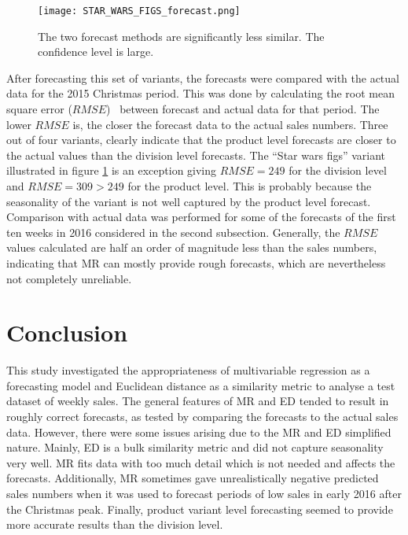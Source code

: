 \documentclass[11pt]{article}
\begin{document}
\begin{figure}[ht]
\centering
\texttt{[image: STAR\_WARS\_FIGS\_forecast.png]}
\caption{The two forecast methods are significantly less similar. The confidence level is large.}
\label{32}
\end{figure}

After forecasting this set of variants, the forecasts were compared with the actual data for the 2015 Christmas period. This was done by calculating the root mean square error ($RMSE$)~\cite{Hynd} between forecast and actual data for that period. The lower $RMSE$ is, the closer the forecast data to the actual sales numbers. Three out of four variants, clearly indicate that the product level forecasts are closer to the actual values than the division level forecasts. The ``Star wars figs'' variant illustrated in figure \ref{32} is an exception giving $RMSE=249$ for the division level and $RMSE=309 > 249$ for the product level. This is probably because the seasonality of the variant is not well captured by the product level forecast.\\

Comparison with actual data was performed for some of the forecasts of the first ten weeks in 2016 considered in the second subsection. Generally, the $RMSE$ values calculated are half an order of magnitude less than the sales numbers, indicating that MR can mostly provide rough forecasts, which are nevertheless not completely unreliable.

\section{Conclusion}
This study investigated the appropriateness of multivariable regression as a forecasting model and  Euclidean distance as a similarity metric to analyse a test dataset of weekly sales. The general features of MR and ED tended to result in roughly correct forecasts, as tested by comparing the forecasts to the actual sales data. However, there were some issues arising due to the MR and ED simplified nature. Mainly, ED is a bulk similarity metric and did not capture seasonality very well. MR fits data with too much detail which is not needed and affects the forecasts. Additionally, MR sometimes gave unrealistically negative predicted sales numbers when it was used to forecast periods of low sales in early 2016 after the Christmas peak. Finally, product variant level forecasting seemed to provide more accurate results than the division level.\\
\end{document}
